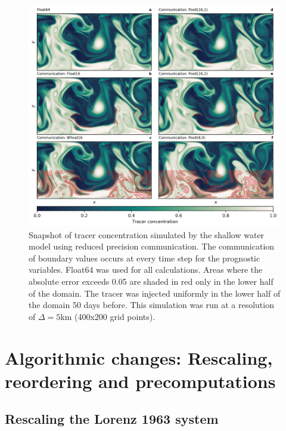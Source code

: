 \documentclass[draft]{agujournal2019}
\begin{document}
\begin{figure}
\includegraphics[width=1\textwidth]{../plots/snapshot_comm.png}
\caption{Snapshot of tracer concentration simulated by the shallow water model using reduced precision communication. The communication of boundary values occurs at every time step for the prognostic variables. Float64 was used for all calculations. Areas where the absolute error exceeds 0.05 are shaded in red only in the lower half of the domain. The tracer was injected uniformly in the lower half of the domain 50 days before. This simulation was run at a resolution of $\Delta = 5$km (400x200 grid points).}
\label{fig:snapshot_comm}
\end{figure}

\section{Algorithmic changes: Rescaling, reordering and precomputations}
\label{sec:rescale}

\subsection{Rescaling the Lorenz 1963 system }
\label{sec:L63_rescale}
\end{document}
